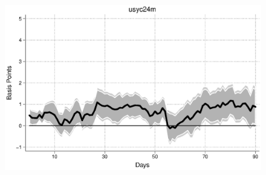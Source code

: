 \documentclass{article}
\begin{document}
\begin{figure}[tbph]
\begin{center}
		\includegraphics[trim={0cm 0cm 0cm 0cm},clip,height=0.3\textheight,width=1\textwidth]{../LagDep-FX/LSAP/US/usyc24m09-19lsap.eps} \\
	\end{center}
\end{figure}

\pagebreak[4]
\end{document}
